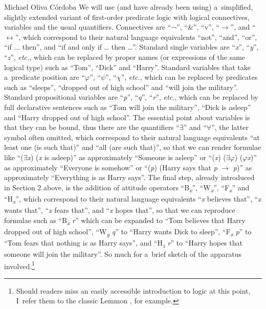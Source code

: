 \begin{artengenv}{Michael Oliva Córdoba}
We will use (and have already been using) a~simplified, slightly extended variant of first-order predicate logic with logical connectives, variables and the usual quantifiers. Connectives are ``¬'', ``\&'', ``v'', ``$\to$'', and ``$\leftrightarrow$'', which correspond to their natural language equivalents ``not'', ``and'', ``or'', ``if ... then'', and ``if and only if … then …''. Standard single variables are ``\textit{x}'', ``\textit{y}'', ``\textit{z}'', \textit{etc.}, which can be replaced by proper names (or expressions of the same logical type) such as ``Tom'', ``Dick'' and ``Harry''. Standard variables that take a~predicate position are ``\textit{$\varphi $}'', ``\textit{$\psi $}'', ``\textit{$\chi $}'', \textit{etc.}, which can be replaced by predicates such as ``sleeps'', ``dropped out of high school'' and ``will join the military''. Standard propositional variables are ``\textit{p}'', ``\textit{q}'', ``\textit{r}'', \textit{etc.}, which can be replaced by full declarative sentences such as ``Tom will join the military'', ``Dick is asleep'' and ``Harry dropped out of high school''. The essential point about variables is that they can be bound, thus there are the quantifiers ``${\exists}$'' and ``${\forall}$'', the latter symbol often omitted, which correspond to their natural language equivalents ``at least one (is such that)'' and ``all (are such that)'', so that we can render formulae like ``(${\exists}$\textit{x}) (\textit{x} is asleep)'' as approximately ``Someone is asleep'' or ``(\textit{x}) (${\exists}$\textit{$\varphi $}) (\textit{$\varphi $x})'' as approximately ``Everyone is somehow'' or ``(\textit{p}) (Harry says that \textit{p} $\to$ \textit{p})'' as approximately ``Everything is as Harry says''. The final step, already introduced in Section 2 above, is the addition of attitude operators ``B\textit{\textsubscript{x}}'', ``W\textit{\textsubscript{x}}'', ``F\textit{\textsubscript{x}}'' and ``H\textit{\textsubscript{x}}'', which correspond to their natural language equivalents ``\textit{x} believes that'', ``\textit{x} wants that'', ``\textit{x} fears that'', and ``\textit{x} hopes that'', so that we can reproduce formulae such as ``B\textit{\textsubscript{x}} \textit{r}'' which can be expanded to ``Tom believes that Harry dropped out of high school'', ``W\textit{\textsubscript{y}} \textit{q}'' to ``Harry wants Dick to sleep'', ``F\textit{\textsubscript{x}} \textit{p}'' to ``Tom fears that nothing is as Harry says'', and ``H\textit{\textsubscript{z}} \textit{r}'' to ``Harry hopes that someone will join the military''. So much for a~brief sketch of the apparatus involved.\footnote{Should readers miss an easily accessible introduction to logic at this point, I~refer them to the classic Lemmon 
\parencite*[][]{lemmon_begining_1965}, %
 for example.}




\end{artengenv}
